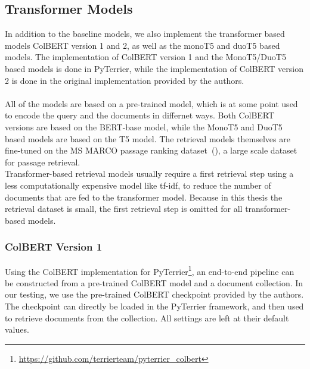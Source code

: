 \subsection{Transformer Models}
In addition to the baseline models, we also implement the transformer based models ColBERT version 1 and 2, as well as the monoT5 and duoT5 based models.
The implementation of ColBERT version 1 and the MonoT5/DuoT5 based models is done in PyTerrier, while the implementation of ColBERT version 2 is done in the original implementation provided by the authors.
\\\\
All of the models are based on a pre-trained model, which is at some point used to encode the query and the documents in differnet ways.
Both ColBERT versions are based on the BERT-base model, while the MonoT5 and DuoT5 based models are based on the T5 model.
The retrieval models themselves are fine-tuned on the MS MARCO passage ranking dataset~(\cite{bajaj:2016:MSMARCO}), a large scale dataset for passage retrieval.
\\
Transformer-based retrieval models usually require a first retrieval step using a less computationally expensive model like tf-idf, to reduce the number of documents that are fed to the transformer model.
Because in this thesis the retrieval dataset is small, the first retrieval step is omitted for all transformer-based models.

\subsubsection{ColBERT Version 1}
Using the ColBERT implementation for PyTerrier\footnote{\url{https://github.com/terrierteam/pyterrier_colbert}}, an end-to-end pipeline can be constructed from a pre-trained ColBERT model and a document collection.
In our testing, we use the pre-trained ColBERT checkpoint provided by the authors.
\\
The checkpoint can directly be loaded in the PyTerrier framework, and then used to retrieve documents from the collection.
All settings are left at their default values.


